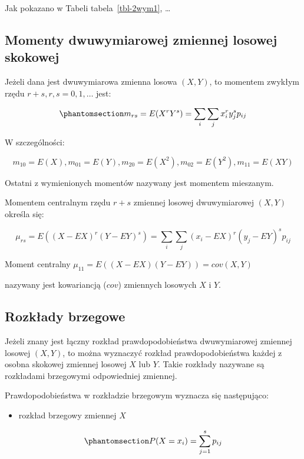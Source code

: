 \documentclass[
  letterpaper,
  DIV=11,
  numbers=noendperiod]{scrreprt}
\providecommand{\tightlist}{%
  \setlength{\itemsep}{0pt}\setlength{\parskip}{0pt}}\usepackage{longtable,booktabs,array}
\begin{document}
Jak pokazano w Tabeli tabela~\ref{tbl-2wym1}, \ldots{}

\subsection{Momenty dwuwymiarowej zmiennej losowej
skokowej}\label{momenty-dwuwymiarowej-zmiennej-losowej-skokowej}

Jeżeli dana jest dwuwymiarowa zmienna losowa \((X,Y)\), to momentem
zwykłym rzędu \(r+s, r, s = 0, 1, \ldots\) jest:

\begin{equation}\phantomsection\label{eq-mom_zw_sk}{ m_{rs}=E(X^rY^s)=\sum_i \sum_j x_i^r y_j^s p_{ij}}\end{equation}

W szczególności:

\[ m_{10}=E(X), m_{01}=E(Y), m_{20}=E(X^2), m_{02}=E(Y^2), m_{11}=E(XY)\]

Ostatni z wymienionych momentów nazywany jest momentem mieszanym.

Momentem centralnym rzędu \(r+s\) zmiennej losowej dwuwymiarowej
\((X,Y)\) określa się:

\[ \mu_{rs}=E ( (X-EX)^r(Y-EY)^s ) =\sum_i \sum_j (x_i-EX)^r (y_j-EY)^s p_{ij}\]

Moment centralny \(\mu_{11} = E((X-EX)(Y-EY))=cov(X,Y)\)

nazywany jest kowariancją (\(cov\)) zmiennych losowych \(X\) i \(Y\).

\subsection{Rozkłady brzegowe}\label{rozkux142ady-brzegowe}

Jeżeli znany jest łączny rozkład prawdopodobieństwa dwuwymiarowej
zmiennej losowej \((X,Y)\), to można wyznaczyć rozkład
prawdopodobieństwa każdej z osobna skokowej zmiennej losowej \(X\) lub
\(Y\). Takie rozkłady nazywane są rozkładami brzegowymi odpowiedniej
zmiennej.

Prawdopodobieństwa w rozkładzie brzegowym wyznacza się następująco:

\begin{itemize}
\tightlist
\item
  rozkład brzegowy zmiennej \(X\)
\end{itemize}

\begin{equation}\phantomsection\label{eq-roz_war_sk1}{ P(X=x_i)=\sum_{j=1}^sp_{ij}}\end{equation}
\end{document}
